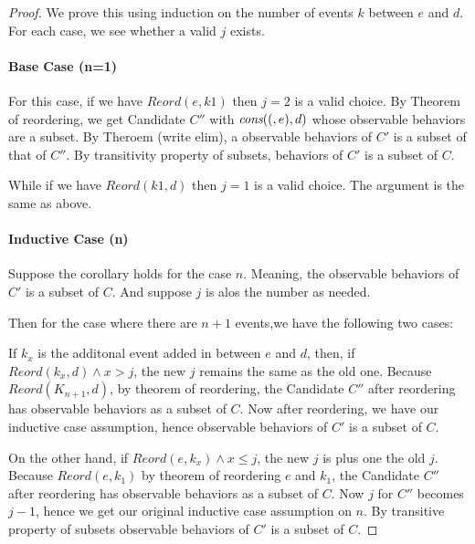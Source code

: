 \begin{proof}

    We prove this using induction on the number of events $k$ between $e$ and $d$. For each case, we see whether a valid $j$ exists. 

    \paragraph{Base Case (n=1)}

        For this case, if we have $Reord(e,k1)$ then $j=2$ is a valid choice. By Theorem of reordering, we get Candidate $C''$ with $\textit{cons}((,e),d)$ whose observable behaviors are a subset. By Theroem (write elim), a observable behaviors of $C'$ is a subset of that of $C''$. By transitivity property of subsets, behaviors of $C'$ is a subset of $C$. 
        
    
        While if we have $Reord(k1,d)$ then $j=1$ is a valid choice. The argument is the same as above. 
        
    \paragraph{Inductive Case (n)}
        
        Suppose the corollary holds for the case $n$. Meaning, the observable behaviors of $C'$ is a subset of $C$. And suppose $j$ is alos the number as needed. 

        Then for the case where there are $n+1$ events,we have the following two cases:

        If $k_x$ is the additonal event added in between $e$ and $d$, then, if $Reord(k_x, d) \wedge x>j$, the new $j$ remains the same as the old one. Because $Reord(K_{n+1}, d)$, by theorem of reordering, the Candidate $C''$ after reordering has observable behaviors as a subset of $C$. Now after reordering, we have our inductive case assumption, hence observable behaviors of $C'$ is a subset of $C$. 
        
        On the other hand, if $Reord(e,k_x) \wedge x \leq j$, the new $j$ is plus one the old $j$. Because $Reord(e,k_1)$  by theorem of reordering $e$ and $k_1$, the Candidate $C''$ after reordering has observable behaviors as a subset of $C$. Now $j$ for $C''$ becomes $j-1$, hence we get our original inductive case assumption on $n$. By transitive property of subsets observable behaviors of $C'$ is a subset of $C$. 


    
\end{proof}